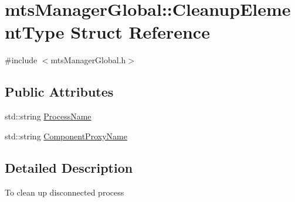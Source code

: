 \hypertarget{structmts_manager_global_1_1_cleanup_element_type}{\section{mts\-Manager\-Global\-:\-:Cleanup\-Element\-Type Struct Reference}
\label{structmts_manager_global_1_1_cleanup_element_type}
}


{\ttfamily \#include $<$mts\-Manager\-Global.\-h$>$}

\subsection*{Public Attributes}
\begin{DoxyCompactItemize}
\item 
std\-::string \hyperlink{structmts_manager_global_1_1_cleanup_element_type_a0cf55ba12a11d5de8a7f703e5358caca}{Process\-Name}
\item 
std\-::string \hyperlink{structmts_manager_global_1_1_cleanup_element_type_abcd5b7bcbc69b8cc83441b0aaf489820}{Component\-Proxy\-Name}
\end{DoxyCompactItemize}


\subsection{Detailed Description}
To clean up disconnected process 

